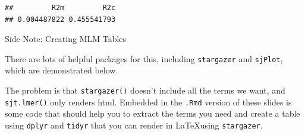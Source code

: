 \begin{frame}[fragile]

\small

\begin{Shaded}
\begin{Highlighting}[]
\OperatorTok{::}
\end{Highlighting}
\end{Shaded}

\begin{verbatim}
##         R2m         R2c 
## 0.004487822 0.455541793
\end{verbatim}

\normalsize

\end{frame}

\begin{frame}[fragile]{Side Note: Creating MLM Tables}

There are lots of helpful packages for this, including
\texttt{stargazer} and \texttt{sjPlot}, which are demonstrated below.\\
\tiny

\begin{Shaded}
\begin{Highlighting}[]
\OperatorTok{::}
\OperatorTok{::}
\end{Highlighting}
\end{Shaded}

The problem is that \texttt{stargazer()} doesn't include all the terms
we want, and \texttt{sjt.lmer()} only renders html. Embedded in the
\texttt{.Rmd} version of these slides is some code that should help you
to extract the terms you need and create a table using \texttt{dplyr}
and \texttt{tidyr} that you can render in \LaTeX using
\texttt{stargazer}.

\normalsize

\end{frame}

